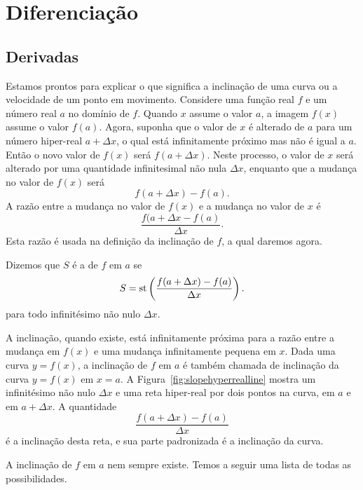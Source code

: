 \graphicspath{ {./figuras/02_diff/} }
\chapter{Diferenciação}
\label{chp:diff}

\section{Derivadas}
\label{sec:derivatives}

Estamos prontos para explicar o que significa a inclinação de uma curva
ou a velocidade de um ponto em movimento. Considere uma função real $f$
e um número real $a$ no domínio de $f$. Quando $x$ assume o valor $a$,
a imagem $f(x)$ assume o valor $f(a)$. Agora, suponha que o valor de $x$
é alterado de $a$ para um número hiper-real $a + \Delta{x}$, o qual está
infinitamente próximo mas não é igual a $a$. Então o novo valor de $f(x)$
será $f(a+\Delta{x})$. Neste processo, o valor de $x$ será alterado por
uma quantidade infinitesimal não nula $\Delta{x}$, enquanto que a mudança
no valor de $f(x)$ será
$$
  f(a+\Delta{x})-f(a).
$$
A razão entre a mudança no valor de $f(x)$ e a mudança no valor de $x$ é
$$
  \frac{f(a+\Delta{x}-f(a)}{\Delta{x}}.
$$
Esta razão é usada na definição da inclinação de $f$, a qual daremos agora.

\begin{defin}
Dizemos que $S$ é a  de $f$ em $a$ se
$$
  S = \operatorname{st}\left(\frac{f(a+\Delta{x})-f(a)}{\Delta{x}}\right).
$$
para todo infinitésimo não nulo $\Delta{x}$.
\end{defin}

A inclinação, quando existe, está infinitamente próxima para a razão entre a
mudança em $f(x)$ e uma mudança infinitamente pequena em $x$. Dada uma curva
$y = f(x)$, a inclinação de $f$ em $a$ é também chamada de inclinação da
curva $y=f(x)$ em $x=a$. A Figura~\ref{fig:slopehyperrealline} mostra um
infinitésimo não nulo $\Delta{x}$ e uma reta hiper-real por dois pontos na
curva, em $a$ e em $a + \Delta{x}$. A quantidade
$$
  \frac{f(a+\Delta{x})-f(a)}{\Delta{x}}
$$
é a inclinação desta reta, e sua parte padronizada é a inclinação da curva.


A inclinação de $f$ em $a$ nem sempre existe. Temos a seguir uma lista de
todas as possibilidades.

